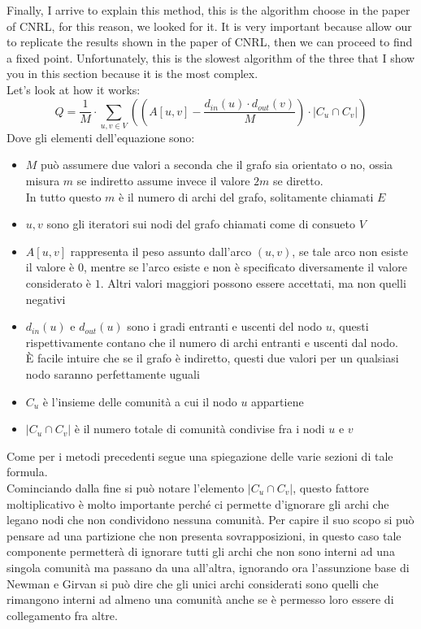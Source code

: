 Finally, I arrive to explain this method, this is the algorithm choose in the paper of CNRL, for this reason, we looked for it. It is very important because allow our to replicate the results shown in the paper of CNRL, then we can proceed to find a fixed point. Unfortunately, this is the slowest algorithm of the three that I show you in this section because it is the most complex.\\
Let's look at how it works:
\begin{equation}
	Q = \frac{1}{M} \cdot \sum_{u,v \in V}
		\left(
			\left( A \left[ u,v \right] - \frac{ d_{in}\left(u\right) \cdot d_{out}\left(v\right) }{M} \right)
			\cdot
			|C_u \cap C_v| 
		\right)
	\label{eq:m_mod}
\end{equation}
Dove gli elementi dell'equazione sono:
\begin{itemize}
	\item $M$ può assumere due valori a seconda che il grafo sia orientato o no, ossia misura $m$ se indiretto assume invece il valore $2m$ se diretto.\\
	In tutto questo $m$ è il numero di archi del grafo, solitamente chiamati $E$
	\item $u,v$ sono gli iteratori sui nodi del grafo chiamati come di consueto $V$
	\item $A \left[ u,v \right]$ rappresenta il peso assunto dall'arco $(u, v)$, se tale arco non esiste il valore è $0$, mentre se l'arco esiste e non è specificato diversamente il valore considerato è $1$. Altri valori maggiori possono essere accettati, ma non quelli negativi
	\item $d_{in}\left(u\right)$ e $d_{out}\left(u\right)$ sono i gradi entranti e uscenti del nodo $u$, questi rispettivamente contano che il numero di archi entranti e uscenti dal nodo.\\
	È facile intuire che se il grafo è indiretto, questi due valori per un qualsiasi nodo saranno perfettamente uguali
	\item $C_u$ è l'insieme delle comunità a cui il nodo $u$ appartiene
	\item $|C_u \cap C_v|$ è il numero totale di comunità condivise fra i nodi $u$ e $v$
\end{itemize}
Come per i metodi precedenti segue una spiegazione delle varie sezioni di tale formula.\\
Cominciando dalla fine si può notare l'elemento $\displaystyle |C_u \cap C_v|$, questo fattore moltiplicativo è molto importante perché ci permette d'ignorare gli archi che legano nodi che non condividono nessuna comunità. Per capire il suo scopo si può pensare ad una partizione che non presenta sovrapposizioni, in questo caso tale componente permetterà di ignorare tutti gli archi che non sono interni ad una singola comunità ma passano da una all'altra, ignorando ora l'assunzione base di Newman e Girvan si può dire che gli unici archi considerati sono quelli che rimangono interni ad almeno una comunità anche se è permesso loro essere di collegamento fra altre.\\
